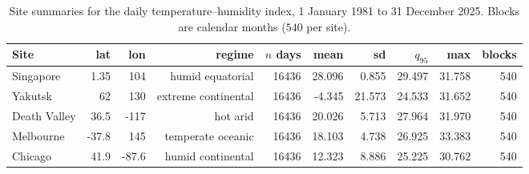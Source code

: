 \begin{table}[t]
\centering
\scriptsize
\caption{Site summaries for the daily temperature--humidity index, 1 January 1981 to 31 December 2025. Blocks are calendar months ($540$ per site).}
\label{tab:app-desc}
\begin{tabular}{lrrrrrrrrr}
\toprule
Site & lat & lon & regime & $n$ days & mean & sd & $q_{95}$ & max & blocks \\
\midrule
Singapore & 1.35 &  104 & humid equatorial & 16436 & 28.096 & 0.855 & 29.497 & 31.758 &  540 \\
Yakutsk &   62 &  130 & extreme continental & 16436 & -4.345 & 21.573 & 24.533 & 31.652 &  540 \\
Death Valley & 36.5 & -117 & hot arid & 16436 & 20.026 & 5.713 & 27.964 & 31.970 &  540 \\
Melbourne & -37.8 &  145 & temperate oceanic & 16436 & 18.103 & 4.738 & 26.925 & 33.383 &  540 \\
Chicago & 41.9 & -87.6 & humid continental & 16436 & 12.323 & 8.886 & 25.225 & 30.762 &  540 \\
\bottomrule
\end{tabular}
\end{table}
